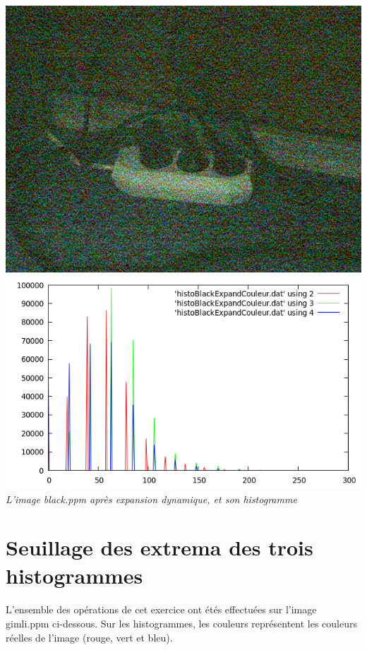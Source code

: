 \documentclass[a4paper,11pt]{article}
\begin{document}
\begin{center}
\includegraphics[scale=0.5]{blackexpandcouleur.png}
\includegraphics[scale=0.5]{histoBackExpandCouleur.png}\\
\textit{L'image black.ppm après expansion dynamique, et son histogramme}
\end{center}

\newpage
\section{Seuillage des extrema des trois histogrammes}
\paragraph{} L'ensemble des opérations de cet exercice ont étés effectuées sur l'image gimli.ppm ci-dessous. Sur les histogrammes, les couleurs représentent les couleurs réelles de l'image (rouge, vert et bleu).
\end{document}
